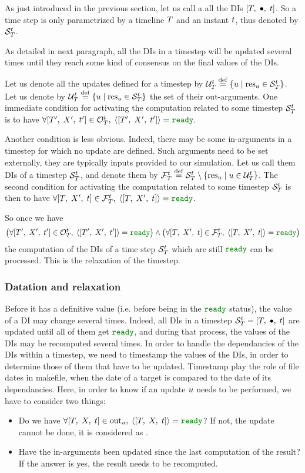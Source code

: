 As just introduced in the previous section, let us call a  all the DIs $\left[ T,\;\bullet,\;t \right]$. So a time step is only parametrized by a timeline $T$ and an instant $t$, thus denoted by ${{\cal S}}_{T}^{t}$.

As detailed in next paragraph, all the DIs in a timestep will be updated several times until they reach some kind of consensus on the final values of the DIs.

Let us denote all the updates defined for a timestep by ${{{\cal U}}_{T}^{t}}\;{\stackrel{\mathrm{def}}{=}}\;{\left\{u\; \middle| \; {{\mathrm{res}}_{u}} \in {{{\cal S}}_{T}^{t}}\right\}}$. Let us denote by ${{{\cal U}}_{T}^{t}}\;{\stackrel{\mathrm{def}}{=}}\;{\left\{u\; \middle| \; {{\mathrm{res}}_{u}} \in {{{\cal S}}_{T}^{t}}\right\}}$ the set of their out-arguments. One immediate condition for activating the computation related to some timestep ${{\cal S}}_{T}^{t}$ is to have $\cxTSOAct$.

Another condition is less obvious. Indeed, there may be some in-arguments in a timestep for which no update are defined. Such arguments need to be set externally, they are typically inputs provided to our simulation. Let us call them  DIs of a timestep ${{\cal S}}_{T}^{t}$, and denote them by ${{{\cal F}}_{T}^{t}}\;{\stackrel{\mathrm{def}}{=}}\;{{{{\cal S}}_{T}^{t}} \setminus {\left\{{\mathrm{res}}_{u}\; \middle| \; {u} \in {{{\cal U}}_{T}^{t}}\right\}}}$. The second condition for activating  the computation related to some timestep ${{\cal S}}_{T}^{t}$ is then to have $\cxTSFAct$.

So once we have $$\cxTSAct$$ the computation of the DIs of a time step ${{\cal S}}_{T}^{t}$ which are still $\cxReady$ can be processed. This is the relaxation of the timestep.


\subsubsection{Datation and relaxation}

Before it has a definitive value (i.e. before being in the $\cxReady$ status), the value of a DI may change several times. Indeed, all DIs in a timestep ${{{\cal S}}_{T}^{t}} = {\left[ T,\;\bullet,\;t \right]}$ are updated until all of them get $\cxReady$, and during that process, the values of the DIs may be recomputed several times. In order to handle the dependancies of the DIs within a timestep, we need to timestamp the values of the DIs, in order to determine those of them that have to be updated. Timestamp play the role of file dates in makefile, when the date of a target is compared to the date of its dependancies. Here, in order to know if an update $u$ needs to be performed, we have to consider two things:
\begin{itemize}
\item Do we have $\cxAllReady$? If not, the update cannot be done, it is considered as .
\item Have the in-arguments been updated since the last computation of the result? If the answer is yes, the result needs to be recomputed.
\end{itemize}

